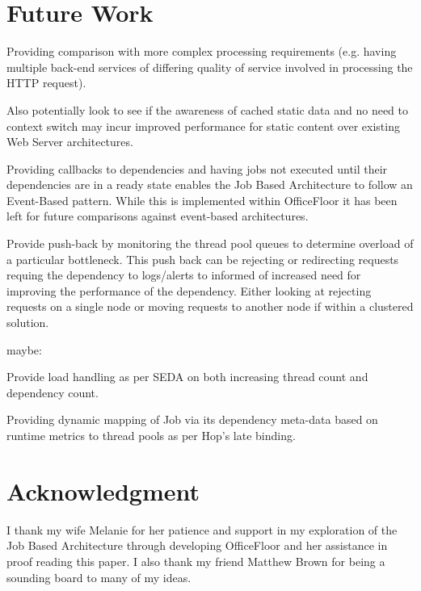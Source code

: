 \documentclass[conference]{ieee/IEEEtran}
\begin{document}
\section{Future Work}
Providing comparison with more complex processing requirements (e.g. having
multiple back-end services of differing quality of service involved in
processing the HTTP request).

Also potentially look to see if the awareness of cached static data and no need
to context switch may incur improved performance for static content over
existing Web Server architectures.

Providing callbacks to dependencies and having jobs not executed until their
dependencies are in a ready state enables the Job Based Architecture to follow
an Event-Based pattern.  While this is implemented within OfficeFloor it has
been left for future comparisons against event-based architectures.

Provide push-back by monitoring the thread pool queues to determine overload of
a particular bottleneck.  This push back can be rejecting or redirecting
requests requing the dependency to logs/alerts to informed of increased need
for improving the performance of the dependency.  Either looking at rejecting
requests on a single node or moving requests to another node if within a
clustered solution.

maybe:

Provide load handling as per SEDA on both increasing thread count and
dependency count.

Providing dynamic mapping of Job via its dependency meta-data based on runtime
metrics to thread pools as per Hop's late binding.






\section*{Acknowledgment}
I thank my wife Melanie for her patience and support in my exploration of the
Job Based Architecture through developing OfficeFloor and her assistance in
proof reading this paper.  I also thank my friend Matthew Brown for being a
sounding board to many of my ideas.





\end{document}
